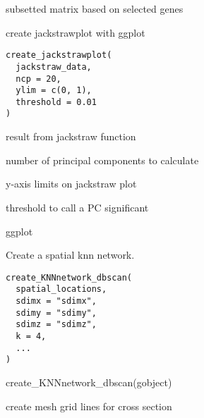 \documentclass[a4paper]{book}
\begin{document}
%
\begin{Value}
subsetted matrix based on selected genes
\end{Value}
%
\begin{Description}\relax
create jackstrawplot with ggplot
\end{Description}
%
\begin{Usage}
\begin{verbatim}
create_jackstrawplot(
  jackstraw_data,
  ncp = 20,
  ylim = c(0, 1),
  threshold = 0.01
)
\end{verbatim}
\end{Usage}
%
\begin{Arguments}
\begin{ldescription}
\item[\code{jackstraw\_data}] result from jackstraw function

\item[\code{ncp}] number of principal components to calculate

\item[\code{ylim}] y-axis limits on jackstraw plot

\item[\code{p-value}] threshold to call a PC significant
\end{ldescription}
\end{Arguments}
%
\begin{Value}
ggplot
\end{Value}
%
\begin{Description}\relax
Create a spatial knn network.
\end{Description}
%
\begin{Usage}
\begin{verbatim}
create_KNNnetwork_dbscan(
  spatial_locations,
  sdimx = "sdimx",
  sdimy = "sdimy",
  sdimz = "sdimz",
  k = 4,
  ...
)
\end{verbatim}
\end{Usage}
%
\begin{Examples}
\begin{ExampleCode}
    create_KNNnetwork_dbscan(gobject)
\end{ExampleCode}
\end{Examples}
%
\begin{Description}\relax
create mesh grid lines for cross section
\end{Description}
\end{document}
